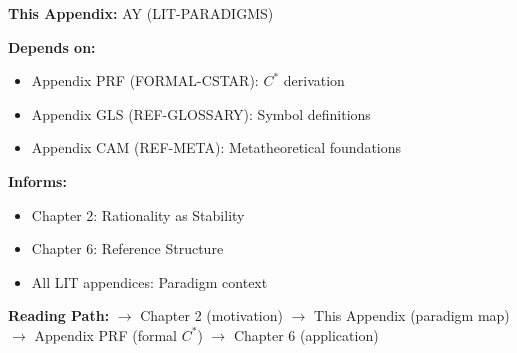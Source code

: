 \begin{tcolorbox}[colback=gray!10!white, colframe=gray!75!black,
    title=\textbf{Cross-Reference Footer}]

\textbf{This Appendix:} AY (LIT-PARADIGMS)

\textbf{Depends on:}
\begin{itemize}[nosep]
    \item Appendix PRF (FORMAL-CSTAR): $C^*$ derivation
    \item Appendix GLS (REF-GLOSSARY): Symbol definitions
    \item Appendix CAM (REF-META): Metatheoretical foundations
\end{itemize}

\textbf{Informs:}
\begin{itemize}[nosep]
    \item Chapter 2: Rationality as Stability
    \item Chapter 6: Reference Structure
    \item All LIT appendices: Paradigm context
\end{itemize}

\textbf{Reading Path:}
$\rightarrow$ Chapter 2 (motivation) $\rightarrow$ This Appendix (paradigm map)
$\rightarrow$ Appendix PRF (formal $C^*$) $\rightarrow$ Chapter 6 (application)

\end{tcolorbox}

